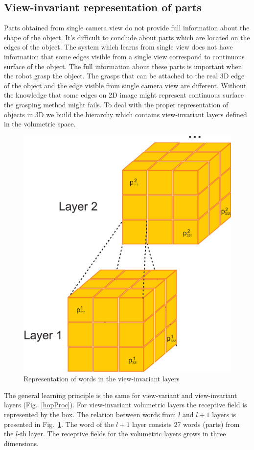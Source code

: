 \documentclass[letterpaper,10pt,conference]{ieeeconf}  %
\begin{document}
\subsection{View-invariant representation of parts}

Parts obtained from single camera view do not provide full information about the shape of the object. It's difficult to conclude about parts which are located on the edges of the object. The system which learns from single view does not have information that some edges visible from a single view correspond to continuous surface of the object. The full information about these parts is important when the robot grasp the object. The grasps that can be attached to the real 3D edge of the object and the edge visible from single camera view are different. Without the knowledge that some edges on 2D image might represent continuous surface the grasping method might fails. To deal with the proper representation of objects in 3D we build the hierarchy which contains view-invariant layers defined in the volumetric space.

\begin{figure}[t]
 \centering
\includegraphics[width=0.75\columnwidth]{../images/wordInd.eps}
\caption{Representation of words in the view-invariant layers}
 \label{wordInv}
\end{figure}

The general learning principle is the same for view-variant and view-invariant layers (Fig.~\ref{hopProc}). For view-invariant volumetric layers the receptive field is represented by the box. The relation between words from $l$ and $l+1$ layers is presented in Fig.~\ref{wordInv}. The word of the $l+1$ layer consists 27 words (parts) from the $l$-th layer. The receptive fields for the volumetric layers grows in three dimensions.
\end{document}
